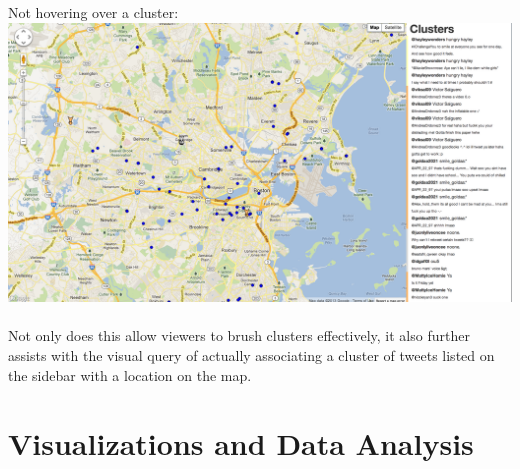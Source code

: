 \documentclass[pdftex,12pt,a4paper]{article}
\begin{document}
Not hovering over a cluster: \\ 
\includegraphics[width=5.5in]{hover2.png} \\ \\
Not only does this allow viewers to brush clusters effectively, it also further assists with the visual query of actually associating a cluster of tweets listed on the sidebar with a location on the map.

\section{Visualizations and Data Analysis} 
\end{document}
